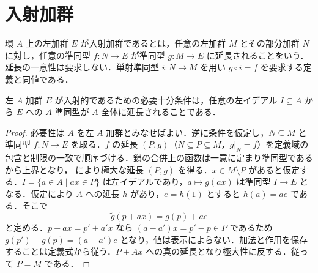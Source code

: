 \section{入射加群}
\begin{defn}[入射加群]
環 $A$ 上の左加群 $E$ が入射加群であるとは，任意の左加群 $M$ とその部分加群 $N$ に対し，任意の準同型 $f:N\to E$ が準同型 $g:M\to E$ に延長されることをいう．延長の一意性は要求しない．単射準同型 $i:N\to M$ を用い $g\circ i=f$ を要求する定義と同値である．
\end{defn}
\begin{prop}[Baerの判定法]
左 $A$ 加群 $E$ が入射的であるための必要十分条件は，任意の左イデアル $I\subseteq A$ から $E$ への $A$ 準同型が $A$ 全体に延長されることである．
\end{prop}
\begin{proof}
必要性は $A$ を左 $A$ 加群とみなせばよい．逆に条件を仮定し，$N\subseteq M$ と準同型 $f:N\to E$ を取る．$f$ の延長 $(P,g)$（$N\subseteq P\subseteq M$，$g|_N=f$）を定義域の包含と制限の一致で順序づける．鎖の合併上の函数は一意に定まり準同型であるから上界となり， により極大な延長 $(P,g)$ を得る．$x\in M\setminus P$ があると仮定する．$I=\{a\in A\mid ax\in P\}$ は左イデアルであり，$a\mapsto g(ax)$ は準同型 $I\to E$ となる．仮定により $A$ への延長 $h$ があり，$e=h(1)$ とすると $h(a)=ae$ である．そこで
\[
 \widetilde g(p+ax)=g(p)+ae
\]
と定める．$p+ax=p'+a'x$ なら $(a-a')x=p'-p\in P$ であるため $g(p')-g(p)=(a-a')e$ となり，値は表示によらない．加法と作用を保存することは定義式から従う．$P+Ax$ への真の延長となり極大性に反する．従って $P=M$ である．
\end{proof}
